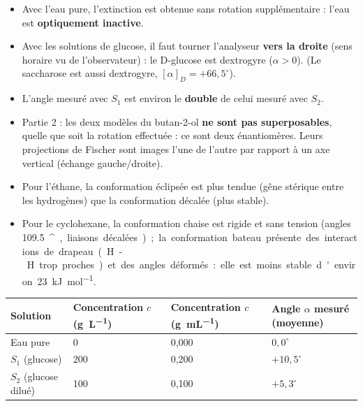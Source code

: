\documentclass[11pt]{article}
\providecommand{\degree}{^{\circ}}
\newcommand{\cle}[1]{{\popxbold\color{popdark}#1}}
\newcounter{popsec}
\newcounter{popsub}
\newcommand{\courssub}[1]{%
  \stepcounter{popsub}%
  \par\vspace{9pt}\noindent{\popxbold\fontsize{11.5}{13}\selectfont\color{popink}{\color{poporange}\thepopsec.\thepopsub}\hspace{6pt}#1}\par\nopagebreak\vspace{4pt}
}
\begin{document}
\begin{itemize}
\item Avec l'eau pure, l'extinction est obtenue sans rotation supplémentaire : l'eau est \textbf{optiquement inactive}.
\item Avec les solutions de glucose, il faut tourner l'analyseur \textbf{vers la droite} (sens horaire vu de l'observateur) : le D-glucose est \cle{dextrogyre} ($\alpha > 0$). (Le saccharose est aussi dextrogyre, $[\alpha]_D = +66,5\degree$).
\item L'angle mesuré avec $S_1$ est environ le \textbf{double} de celui mesuré avec $S_2$.
\item Partie 2 : les deux modèles du butan-2-ol \textbf{ne sont pas superposables}, quelle que soit la rotation effectuée : ce sont deux énantiomères. Leurs projections de Fischer sont images l'une de l'autre par rapport à un axe vertical (échange gauche/droite).
\item Pour l'éthane, la conformation éclipsée est plus \og tendue \fg{} (gêne stérique entre les hydrogènes) que la conformation décalée (plus stable).
\item Pour le cyclohexane, la conformation chaise est rigide et sans tension (angles \SI{109,5}{\degree}, liaisons décalées) ; la conformation bateau présente des interactions de drapeau (H-H trop proches) et des angles déformés : elle est moins stable d'environ \SI{23}{kJ.mol^{-1}}.
\end{itemize}

\begin{center}
\begin{tabularx}{\linewidth}{|l|X|X|X|}
\hline
\rowcolor{popgreen!40} \textbf{Solution} & \textbf{Concentration $c$ (\si{g.L^{-1}})} & \textbf{Concentration $c$ (\si{g.mL^{-1}})} & \textbf{Angle $\alpha$ mesuré (moyenne)} \\
\hline
Eau pure & 0 & 0,000 & $0,0\degree$ \\
\hline
$S_1$ (glucose) & 200 & 0,200 & $+10,5\degree$ \\
\hline
$S_2$ (glucose dilué) & 100 & 0,100 & $+5,3\degree$ \\
\hline
\end{tabularx}
\end{center}

\courssub{Exploitation}
\end{document}
